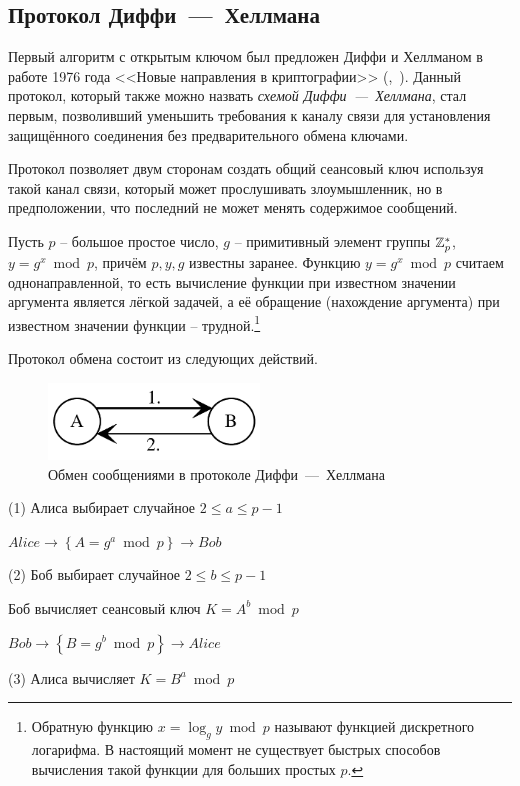 \subsection{Протокол Диффи~---~Хеллмана}\label{section-protocols-diffie-hellman}

Первый алгоритм с открытым ключом был предложен Диффи и Хеллманом в работе 1976 года <<Новые направления в криптографии>> (,~\cite{Diffie:Hellman:1976}). Данный протокол, который также можно назвать \emph{схемой Диффи~---~Хеллмана}, стал первым, позволивший уменьшить требования к каналу связи для установления защищённого соединения без предварительного обмена ключами.

Протокол позволяет двум сторонам создать общий сеансовый ключ используя такой канал связи, который может прослушивать злоумышленник, но в предположении, что последний не может менять содержимое сообщений.

Пусть $p$ -- большое простое число, $g$ -- примитивный элемент группы $\mathbb{Z}_p^*$, ~ $y = g^x \bmod p$, причём $p, y, g$ известны заранее. Функцию $y=g^{x} \bmod p$ считаем однонаправленной, то есть вычисление функции при известном значении аргумента является лёгкой задачей, а её обращение (нахождение аргумента) при известном значении функции -- трудной.\footnote{Обратную функцию $x = \log_g y \bmod p$ называют функцией дискретного логарифма. В настоящий момент не существует быстрых способов вычисления такой функции для больших простых $p$.}

Протокол обмена состоит из следующих действий.

\begin{figure}
    \centering
    \includegraphics[width=0.5\textwidth]{pic/key_distribution-diffie-hellman}
    \caption{Обмен сообщениями в протоколе Диффи~---~Хеллмана\label{fig:key_distribution-diffie-hellman}}
\end{figure}

\begin{protocol}
    \item[(1)] Алиса выбирает случайное $2 \leq a \leq p - 1$
    \item[{}] $Alice \to \left\{ A = g ^ a \bmod p \right\} \to Bob$
    \item[(2)] Боб выбирает случайное $2 \leq b \leq p-1$
    \item[{}] Боб вычисляет сеансовый ключ $K = A ^ b \bmod p$
    \item[{}] $Bob \to \left\{ B = g ^ b \bmod p \right\} \to Alice$
    \item[(3)] Алиса вычисляет $K = B ^ a \bmod p$
\end{protocol}

